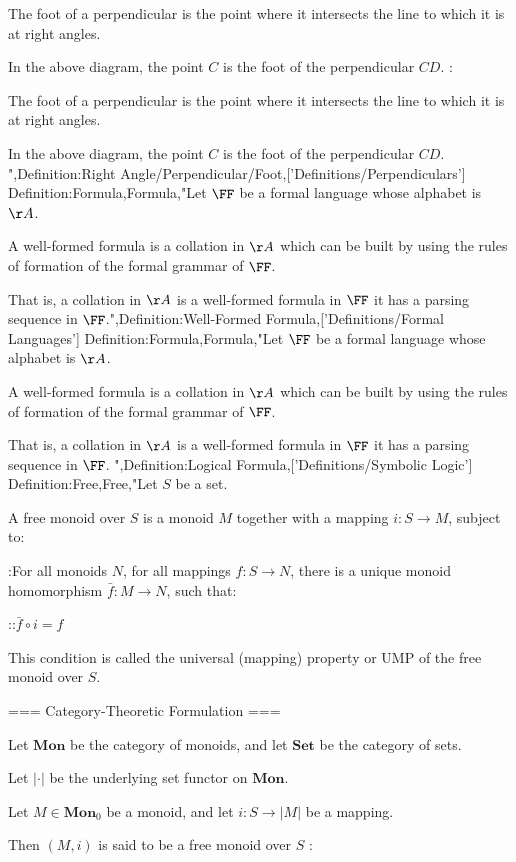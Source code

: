 The foot of a perpendicular is the point where it intersects the line to which it is at right angles.

In the above diagram, the point $C$ is the foot of the perpendicular $CD$.
:


The foot of a perpendicular is the point where it intersects the line to which it is at right angles.

In the above diagram, the point $C$ is the foot of the perpendicular $CD$.
",Definition:Right Angle/Perpendicular/Foot,['Definitions/Perpendiculars']
Definition:Formula,Formula,"Let $\FF$ be a formal language whose alphabet is $\AA$.

A well-formed formula is a collation in $\AA$ which can be built by using the rules of formation of the formal grammar of $\FF$.


That is, a collation in $\AA$ is a well-formed formula in $\FF$  it has a parsing sequence in $\FF$.",Definition:Well-Formed Formula,['Definitions/Formal Languages']
Definition:Formula,Formula,"Let $\FF$ be a formal language whose alphabet is $\AA$.

A well-formed formula is a collation in $\AA$ which can be built by using the rules of formation of the formal grammar of $\FF$.


That is, a collation in $\AA$ is a well-formed formula in $\FF$  it has a parsing sequence in $\FF$.
",Definition:Logical Formula,['Definitions/Symbolic Logic']
Definition:Free,Free,"Let $S$ be a set.


A free monoid over $S$ is a monoid $M$ together with a mapping $i: S \to M$, subject to:

:For all monoids $N$, for all mappings $f: S \to N$, there is a unique monoid homomorphism $\bar f: M \to N$, such that:

::$\bar f \circ i = f$

This condition is called the universal (mapping) property or UMP of the free monoid over $S$.


=== Category-Theoretic Formulation ===

Let $\mathbf{Mon}$ be the category of monoids, and let $\mathbf{Set}$ be the category of sets.

Let $\left\vert{\cdot}\right\vert$ be the underlying set functor on $\mathbf{Mon}$.


Let $M \in \mathbf{Mon}_0$ be a monoid, and let $i: S \to \left\vert{M}\right\vert$ be a mapping.

Then $\left({M, i}\right)$ is said to be a free monoid over $S$ :

